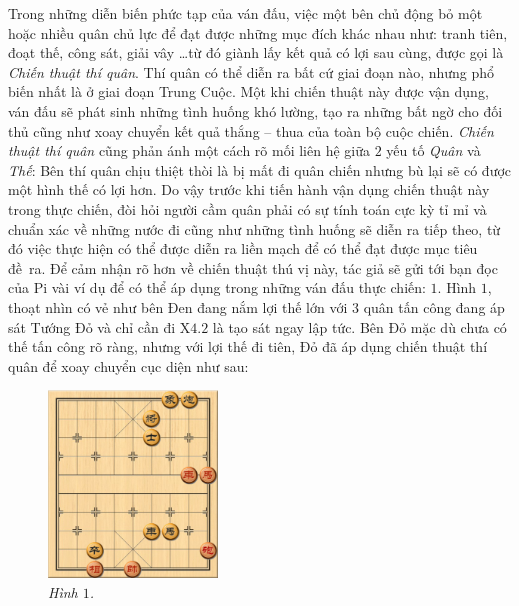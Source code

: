 \vspace*{155pt}
\begin{multicols}{2}	
	Trong những diễn biến phức tạp của ván đấu, việc một bên chủ động bỏ một hoặc nhiều quân chủ lực để đạt được những mục đích khác nhau như: tranh tiên, đoạt thế, công sát, giải vây \ldots từ đó giành lấy kết quả có lợi sau cùng, được gọi là \textit{Chiến thuật thí quân}. Thí quân có thể diễn ra bất cứ giai đoạn nào, nhưng phổ biến nhất là ở giai đoạn Trung Cuộc. Một khi chiến thuật này được vận dụng, ván đấu sẽ phát sinh những tình huống khó lường, tạo ra những bất ngờ cho đối thủ cũng như xoay chuyển kết quả thắng -- thua của toàn bộ cuộc chiến.
	\vskip 0.1cm
	\textit{Chiến thuật thí quân} cũng phản ánh một cách rõ mối liên hệ giữa $2$ yếu tố \textit{Quân} và \textit{Thế}: Bên thí quân chịu thiệt thòi là bị mất đi quân chiến nhưng bù lại sẽ có được một hình thế có lợi hơn. Do vậy trước khi tiến hành vận dụng chiến thuật này trong thực chiến, đòi hỏi người cầm quân phải có sự tính toán cực kỳ tỉ mỉ và chuẩn xác về những nước đi cũng như những tình huống sẽ diễn ra tiếp theo, từ đó việc thực hiện có thể được diễn ra liền mạch để có thể đạt được mục tiêu đề~ra.
	\vskip 0.1cm
	Để cảm nhận rõ hơn về chiến thuật thú vị này, tác giả sẽ gửi tới bạn đọc của Pi vài ví dụ  để có thể  áp dụng trong những ván đấu thực chiến:
	\vskip 0.1cm
	$1.$ Hình $1$, thoạt nhìn có vẻ như bên Đen đang nắm lợi thế lớn với $3$ quân tấn công đang áp sát Tướng Đỏ và chỉ cần đi X$4.2$ là tạo sát ngay lập tức. Bên Đỏ mặc dù chưa có thế tấn công rõ ràng, nhưng với lợi thế đi tiên, Đỏ đã áp dụng chiến thuật thí quân để xoay chuyển cục diện như sau:
	\begin{figure}[H]
		\vspace*{-5pt}
		\centering
		\captionsetup{labelformat= empty, justification=centering}
		\includegraphics[width= 0.4\textwidth]{1}
		\caption{\small\textit{\color{gocco}Hình $1$.}}
		\vspace*{-10pt}
	\end{figure}

\end{multicols}
